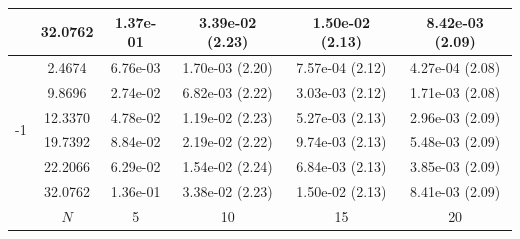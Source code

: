 \documentclass[onefignum,onetabnum,final]{siamart250211}
\numberwithin{equation}{section}
\newcommand\0{\boldsymbol{0}}
\begin{document}
\begin{table}[!hbt]
{\begin{tabular}{|c|c|cccc|}
				&   32.0762 &   1.37e-01  &   3.39e-02 (2.23) &   1.50e-02 (2.13) &   8.42e-03 (2.09)   \\
				\hline
				\multirow{6}{0.02\linewidth}{-1}&    2.4674 &   6.76e-03  &   1.70e-03 (2.20) &   7.57e-04 (2.12) &   4.27e-04 (2.08)   \\
				&    9.8696 &   2.74e-02  &   6.82e-03 (2.22) &   3.03e-03 (2.12) &   1.71e-03 (2.08)   \\
				&   12.3370 &   4.78e-02  &   1.19e-02 (2.23) &   5.27e-03 (2.13) &   2.96e-03 (2.09)   \\
				&   19.7392 &   8.84e-02  &   2.19e-02 (2.22) &   9.74e-03 (2.13) &   5.48e-03 (2.09)   \\
				&   22.2066 &   6.29e-02  &   1.54e-02 (2.24) &   6.84e-03 (2.13) &   3.85e-03 (2.09)   \\
				&   32.0762 &   1.36e-01  &   3.38e-02 (2.23) &   1.50e-02 (2.13) &   8.41e-03 (2.09)   \\
				\hline
				&$N$&5&10&15 &20\\
				\hline
				\hline
		\end{tabular}}
		
	\end{table}
	
\end{document}
